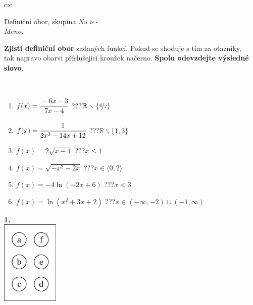 \documentclass[10pt]{report}
\begin{document}
\begin{tabular}{c:c}
\begin{minipage}[c][104.5mm][t]{0.5\linewidth}
\begin{center}
\vspace{7mm}
{\huge Definiční obor, skupina \textit{Nu $\nu$} -}\\[5mm]
\textit{Meno:}\phantom{xxxxxxxxxxxxxxxxxxxxxxxxxxxxxxxxxxxxxxxxxxxxxxxxxxxxxxxxxxxxxxxxx}\\[5mm]
\begin{minipage}{0.95\linewidth}
\textbf{Zjisti definiční obor} zadaných funkcí. Pokud se shoduje s tím za otazníky,\\tak napravo obarvi příslušející kroužek načerno. \textbf{Spolu odevzdejte výsledné slovo}.
\end{minipage}
\\[1mm]
\begin{minipage}{0.79\linewidth}
\begin{center}
\begin{varwidth}{\linewidth}
\begin{enumerate}
\normalsizerrr
\item $f(x)=\cfrac{-6x-3}{7x-4}$\quad \dotfill\; ???\;\dotfill \quad $\mathbb{R}\smallsetminus\{\nicefrac{4}{7}\}$
\item $f(x)=\cfrac{1}{2x^3-14x+12}$\quad \dotfill\; ???\;\dotfill \quad $\mathbb{R}\smallsetminus\{1,3\}$
\item $f(x)=2\sqrt{x-1}$\quad \dotfill\; ???\;\dotfill \quad $x\leq1$
\item $f(x)=\sqrt{-x^2-2x}$\quad \dotfill\; ???\;\dotfill \quad $x\in\langle0 , 2\rangle$
\item $f(x)=-4\ln{(-2x+6)}$\quad \dotfill\; ???\;\dotfill \quad $x<3$
\item $f(x)=\ln{(x^2+3x+2)}$\quad \dotfill\; ???\;\dotfill \quad $x\in(-\infty , -2)\cup(-1 , \infty)$
\end{enumerate}
\end{varwidth}
\end{center}
\end{minipage}
\begin{minipage}{0.20\linewidth}
\begin{center}
{\Huge\bfseries 1.} \\[2mm]
\includegraphics[height=40mm]{../images/braille.png}

\end{center}
\end{minipage}
\end{center}
\end{minipage}
\end{tabular}
\end{document}
